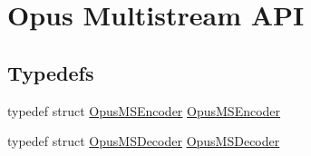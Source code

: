 \hypertarget{group__opus__multistream}{}\section{Opus Multistream A\+PI}
\label{group__opus__multistream}
\subsection*{Typedefs}
\begin{DoxyCompactItemize}
\item 
typedef struct \mbox{\hyperlink{group__opus__multistream_gae5826674d142fc873ebc1d781c507dd7}{Opus\+M\+S\+Encoder}} \mbox{\hyperlink{group__opus__multistream_gae5826674d142fc873ebc1d781c507dd7}{Opus\+M\+S\+Encoder}}
\item 
typedef struct \mbox{\hyperlink{group__opus__multistream_gad3497495deb9a8ace82e76cd4f93e0e4}{Opus\+M\+S\+Decoder}} \mbox{\hyperlink{group__opus__multistream_gad3497495deb9a8ace82e76cd4f93e0e4}{Opus\+M\+S\+Decoder}}
\end{DoxyCompactItemize}
